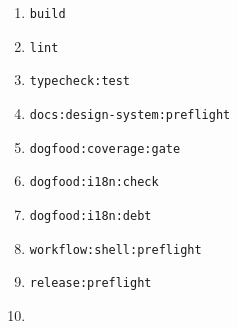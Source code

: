 \begin{enumerate}
\def\labelenumi{\arabic{enumi}.}
\tightlist
\item
  \texttt{b\allowbreak{}u\allowbreak{}i\allowbreak{}l\allowbreak{}d}
\item
  \texttt{l\allowbreak{}i\allowbreak{}n\allowbreak{}t}
\item
  \texttt{t\allowbreak{}y\allowbreak{}p\allowbreak{}e\allowbreak{}c\allowbreak{}h\allowbreak{}e\allowbreak{}c\allowbreak{}k\allowbreak{}:\allowbreak{}t\allowbreak{}e\allowbreak{}s\allowbreak{}t}
\item
  \texttt{d\allowbreak{}o\allowbreak{}c\allowbreak{}s\allowbreak{}:\allowbreak{}d\allowbreak{}e\allowbreak{}s\allowbreak{}i\allowbreak{}g\allowbreak{}n\allowbreak{}-\allowbreak{}s\allowbreak{}y\allowbreak{}s\allowbreak{}t\allowbreak{}e\allowbreak{}m\allowbreak{}:\allowbreak{}p\allowbreak{}r\allowbreak{}e\allowbreak{}f\allowbreak{}l\allowbreak{}i\allowbreak{}g\allowbreak{}h\allowbreak{}t}
\item
  \texttt{d\allowbreak{}o\allowbreak{}g\allowbreak{}f\allowbreak{}o\allowbreak{}o\allowbreak{}d\allowbreak{}:\allowbreak{}c\allowbreak{}o\allowbreak{}v\allowbreak{}e\allowbreak{}r\allowbreak{}a\allowbreak{}g\allowbreak{}e\allowbreak{}:\allowbreak{}g\allowbreak{}a\allowbreak{}t\allowbreak{}e}
\item
  \texttt{d\allowbreak{}o\allowbreak{}g\allowbreak{}f\allowbreak{}o\allowbreak{}o\allowbreak{}d\allowbreak{}:\allowbreak{}i\allowbreak{}1\allowbreak{}8\allowbreak{}n\allowbreak{}:\allowbreak{}c\allowbreak{}h\allowbreak{}e\allowbreak{}c\allowbreak{}k}
\item
  \texttt{d\allowbreak{}o\allowbreak{}g\allowbreak{}f\allowbreak{}o\allowbreak{}o\allowbreak{}d\allowbreak{}:\allowbreak{}i\allowbreak{}1\allowbreak{}8\allowbreak{}n\allowbreak{}:\allowbreak{}d\allowbreak{}e\allowbreak{}b\allowbreak{}t}
\item
  \texttt{w\allowbreak{}o\allowbreak{}r\allowbreak{}k\allowbreak{}f\allowbreak{}l\allowbreak{}o\allowbreak{}w\allowbreak{}:\allowbreak{}s\allowbreak{}h\allowbreak{}e\allowbreak{}l\allowbreak{}l\allowbreak{}:\allowbreak{}p\allowbreak{}r\allowbreak{}e\allowbreak{}f\allowbreak{}l\allowbreak{}i\allowbreak{}g\allowbreak{}h\allowbreak{}t}
\item
  \texttt{r\allowbreak{}e\allowbreak{}l\allowbreak{}e\allowbreak{}a\allowbreak{}s\allowbreak{}e\allowbreak{}:\allowbreak{}p\allowbreak{}r\allowbreak{}e\allowbreak{}f\allowbreak{}l\allowbreak{}i\allowbreak{}g\allowbreak{}h\allowbreak{}t}
\item

\end{enumerate}

